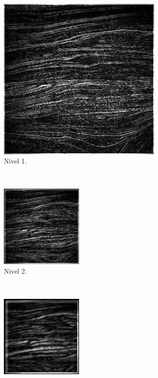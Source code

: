\documentclass[12pt, letterpaper]{article}
\begin{document}
\begin{figure}[H]
  \centering
  \begin{subfigure}[t]{0.48\textwidth}
    \centering
    \includegraphics[width = 0.9\textwidth]{madera/lp1.png}
    \caption{Nivel 1.}
  \end{subfigure}
  ~ 
  \begin{subfigure}[t]{0.48\textwidth}
      \centering
      \includegraphics[width = 0.45\textwidth]{madera/lp2.png}
      \caption{Nivel 2.}
  \end{subfigure}
  ~ 
  \begin{subfigure}[t]{0.32\textwidth}
      \centering
      \includegraphics[width = 0.45\textwidth]{madera/lp3.png}

\end{subfigure}
\end{figure}
\end{document}
